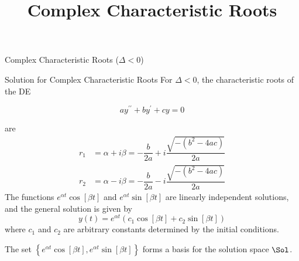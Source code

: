 \documentclass{beamer}
\title[MATH 2250 - Section 4.3]{Complex Characteristic Roots}
\begin{document}
\begin{frame}
  \titlepage
\end{frame}

\begin{frame}{Complex Characteristic Roots ($\Delta<0$)}
\begin{block}{Solution for Complex Characteristic Roots}
For $\Delta<0$, the characteristic roots of the DE

\vspace{-4mm}
\begin{equation*}
ay^{\prime\prime}+by^{\prime}+cy=0
\end{equation*}

\vspace{-5mm}
are
\begin{equation*}
\begin{aligned}
r_1&=\alpha+i\beta = -\dfrac{b}{2a}+i\dfrac{\sqrt{-(b^2-4ac)}}{2a}\\
r_2&=\alpha-i\beta = -\dfrac{b}{2a}-i\dfrac{\sqrt{-(b^2-4ac)}}{2a}
\end{aligned}
\end{equation*}\pause
The functions $e^{\alpha t}\cos[\beta t]$ and $e^{\alpha t}\sin[\beta t]$ are linearly independent solutions, and the general solution is given by
\begin{equation*}
y(t)=e^{\alpha t}\left(c_1\cos[\beta t]+c_2\sin[\beta t]\right)
\end{equation*}
where $c_1$ and $c_2$ are arbitrary constants determined by the initial conditions.\pause

The set $\left\{e^{\alpha t}\cos[\beta t],e^{\alpha t}\sin[\beta t]\right\}$ forms a basis for the solution space $\Sol$.
\end{block}
\end{frame}
\end{document}
